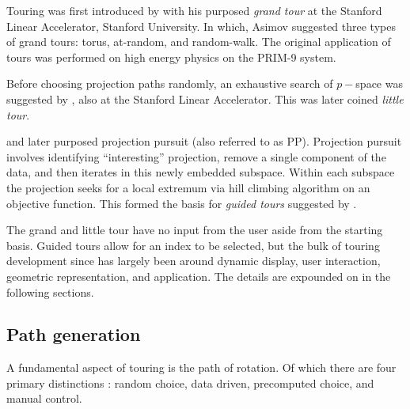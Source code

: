 \documentclass{monashthesis}
\begin{document}
Touring was first introduced by \textcite{asimov_grand_1985} with his
purposed \emph{grand tour} at the Stanford Linear Accelerator, Stanford
University. In which, Asimov suggested three types of grand tours:
torus, at-random, and random-walk. The original application of tours was
performed on high energy physics on the PRIM-9 system.

Before choosing projection paths randomly, an exhaustive search of
\(p-\)space was suggested by \textcite{mcdonald_interactive_1982}, also
at the Stanford Linear Accelerator. This was later coined \emph{little
tour}.

\textcite{friedman_projection_1974} and later
\textcite{huber_projection_1985} purposed projection pursuit (also
referred to as PP). Projection pursuit involves identifying
``interesting'' projection, remove a single component of the data, and
then iterates in this newly embedded subspace. Within each subspace the
projection seeks for a local extremum via hill climbing algorithm on an
objective function. This formed the basis for \emph{guided tours}
suggested by \textcite{hurley_analyzing_1990}.

The grand and little tour have no input from the user aside from the
starting basis. Guided tours allow for an index to be selected, but the
bulk of touring development since has largely been around dynamic
display, user interaction, geometric representation, and application.
The details are expounded on in the following sections.

\subsection{Path generation}\label{path-generation}

A fundamental aspect of touring is the path of rotation. Of which there
are four primary distinctions \autocite{buja_computational_2005}: random
choice, data driven, precomputed choice, and manual control.
\end{document}
